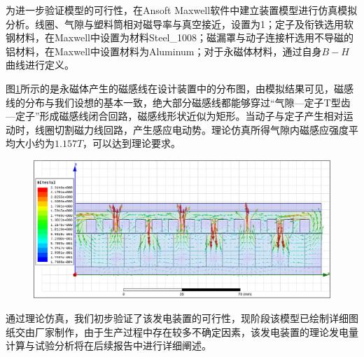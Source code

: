 为进一步验证模型的可行性，在Ansoft Maxwell软件中建立装置模型进行仿真模拟分析。线圈、气隙与塑料筒相对磁导率与真空接近，设置为1；定子及衔铁选用软钢材料，在Maxwell中设置为材料Steel\_1008；磁漏罩与动子连接杆选用不导磁的铝材料，在Maxwell中设置材料为Aluminum；对于永磁体材料，通过自身$B-H$曲线进行定义。

图\ref{simu}所示的是永磁体产生的磁感线在设计装置中的分布图，由模拟结果可见，磁感线的分布与我们设想的基本一致，绝大部分磁感线都能够穿过“气隙—定子T型齿—定子”形成磁感线闭合回路，磁感线形状近似为矩形。当动子与定子产生相对运动时，线圈切割磁力线回路，产生感应电动势。理论仿真所得气隙内磁感应强度平均大小约为$1.157T$，可以达到理论要求。

\begin{figure}[htb]
	\centering
	\label{simu}
	\includegraphics[width=5in]{figure/simu}
\end{figure}

通过理论仿真，我们初步验证了该发电装置的可行性，现阶段该模型已绘制详细图纸交由厂家制作，由于生产过程中存在较多不确定因素，该发电装置的理论发电量计算与试验分析将在后续报告中进行详细阐述。